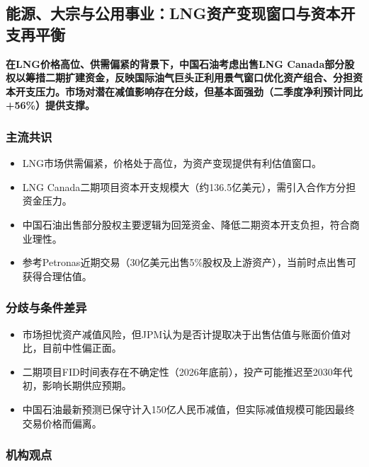 \documentclass[11pt]{ctexart}
\begin{document}
\subsection{能源、大宗与公用事业：LNG资产变现窗口与资本开支再平衡}
\textbf{在LNG价格高位、供需偏紧的背景下，中国石油考虑出售LNG Canada部分股权以筹措二期扩建资金，反映国际油气巨头正利用景气窗口优化资产组合、分担资本开支压力。市场对潜在减值影响存在分歧，但基本面强劲（二季度净利预计同比+56\%）提供支撑。}
\subsubsection*{主流共识}
\begin{itemize}
  \item LNG市场供需偏紧，价格处于高位，为资产变现提供有利估值窗口。
  \item LNG Canada二期项目资本开支规模大（约136.5亿美元），需引入合作方分担资金压力。
  \item 中国石油出售部分股权主要逻辑为回笼资金、降低二期资本开支负担，符合商业理性。
  \item 参考Petronas近期交易（30亿美元出售5\%股权及上游资产），当前时点出售可获得合理估值。
\end{itemize}
\subsubsection*{分歧与条件差异}
\begin{itemize}
  \item 市场担忧资产减值风险，但JPM认为是否计提取决于出售估值与账面价值对比，目前中性偏正面。
  \item 二期项目FID时间表存在不确定性（2026年底前），投产可能推迟至2030年代初，影响长期供应预期。
  \item 中国石油最新预测已保守计入150亿人民币减值，但实际减值规模可能因最终交易价格而偏离。
\end{itemize}
\subsubsection*{机构观点}
\end{document}
